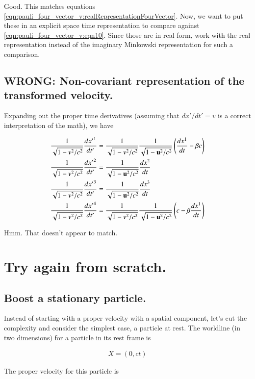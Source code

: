 Good.  This matches equations \ref{eqn:pauli_four_vector_v:realRepresentationFourVector}.  Now, we want to put these in an explicit space time representation
to compare against \ref{eqn:pauli_four_vector_v:eqn10}.  Since those are in real form, work with the real representation instead of the imaginary Minkowski
representation for such a comparison.

\subsection{WRONG: Non-covariant representation of the transformed velocity. }

Expanding out the proper time derivatives (assuming that $dx'/dt' = v$ is a correct interpretation of the math), we have

\begin{align*}
\frac{1}{\sqrt{1 - v^2/c^2}} \frac{{dx'}^1}{dt'} &= \frac{1}{\sqrt{1 - v^2/c^2}} \frac{1}{\sqrt{1 - \mathbf{u}^2/c^2}} \left( \frac{dx^1}{dt} - \beta c \right) \\
\frac{1}{\sqrt{1 - v^2/c^2}} \frac{{dx'}^2}{dt'} &= \frac{1}{\sqrt{1 - \mathbf{u}^2/c^2}} \frac{dx^2}{dt} \\
\frac{1}{\sqrt{1 - v^2/c^2}} \frac{{dx'}^3}{dt'} &= \frac{1}{\sqrt{1 - \mathbf{u}^2/c^2}} \frac{dx^3}{dt} \\
\frac{1}{\sqrt{1 - v^2/c^2}} \frac{{dx'}^4}{dt'} &= \frac{1}{\sqrt{1 - v^2/c^2}} \frac{1}{\sqrt{1 - \mathbf{u}^2/c^2}} \left( c - \beta \frac{dx^1}{dt} \right)
\end{align*}

Hmm.  That doesn't appear to match.

\section{Try again from scratch. }

\subsection{Boost a stationary particle. }

Instead of starting with a proper velocity with a spatial component, let's cut the complexity and consider the simplest case, a particle at rest.  The worldline (in two dimensions) for a particle in its rest frame is

\begin{align*}
X = (0, ct) 
\end{align*}

The proper velocity for this particle is 

